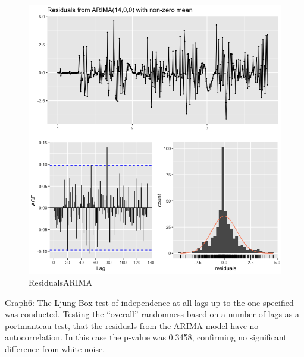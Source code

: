 \documentclass[]{article}
\begin{document}
\begin{figure}
\centering
\includegraphics{ResidualsARIMA.png}
\caption{ResidualsARIMA}
\end{figure}

Graph6: The Ljung-Box test of independence at all lags up to the one
specified was conducted. Testing the ``overall'' randomness based on a
number of lags as a portmanteau test, that the residuals from the ARIMA
model have no autocorrelation. In this case the p-value was 0.3458,
confirming no significant difference from white noise.
\end{document}

